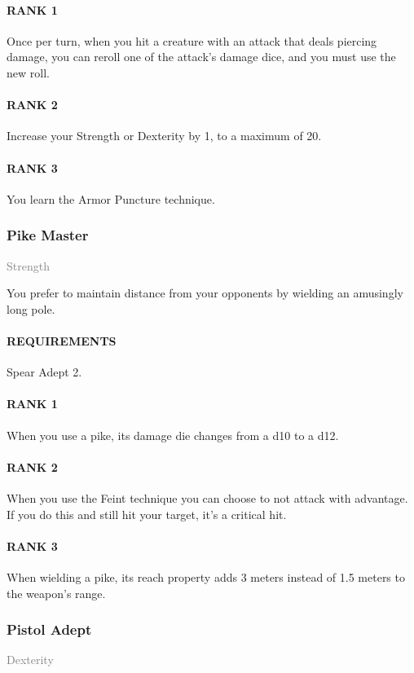 \paragraph{RANK 1} Once per turn, when you hit a creature with an attack that deals piercing damage, you can reroll one of the attack's damage dice, and you must use the new roll.
\paragraph{RANK 2} Increase your Strength or Dexterity by 1, to a maximum of 20.
\paragraph{RANK 3} You learn the Armor Puncture technique.

\subsubsection{Pike Master} \label{feat::pikemaster}
\small{\textcolor{gray}{Strength}}

\normalsize
You prefer to maintain distance from your opponents by wielding an amusingly long pole.
\paragraph{REQUIREMENTS} Spear Adept 2.
\paragraph{RANK 1} When you use a pike, its damage die changes from a d10 to a d12.
\paragraph{RANK 2} When you use the Feint technique you can choose to not attack with advantage.
If you do this and still hit your target, it's a critical hit.
\paragraph{RANK 3} When wielding a pike, its reach property adds 3 meters instead of 1.5 meters to the weapon's range.

\subsubsection{Pistol Adept} \label{feat::pistoladept}
\small{\textcolor{gray}{Dexterity}}

